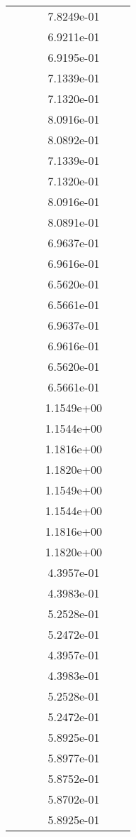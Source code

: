 \begin{xltabular}{\textwidth}{r|rS[table-format=1.3e+2]S[table-format=1.4e+2]S[table-format=1.4e+2]S[table-format=-1.5]}
&  &  & 7.8249e-01 & & \\
&  &  & 6.9211e-01 & & \\
&  &  & 6.9195e-01 & & \\
&  &  & 7.1339e-01 & & \\
&  &  & 7.1320e-01 & & \\
&  &  & 8.0916e-01 & & \\
&  &  & 8.0892e-01 & & \\
&  &  & 7.1339e-01 & & \\
&  &  & 7.1320e-01 & & \\
&  &  & 8.0916e-01 & & \\
&  &  & 8.0891e-01 & & \\
&  &  & 6.9637e-01 & & \\
&  &  & 6.9616e-01 & & \\
&  &  & 6.5620e-01 & & \\
&  &  & 6.5661e-01 & & \\
&  &  & 6.9637e-01 & & \\
&  &  & 6.9616e-01 & & \\
&  &  & 6.5620e-01 & & \\
&  &  & 6.5661e-01 & & \\
&  &  & 1.1549e+00 & & \\
&  &  & 1.1544e+00 & & \\
&  &  & 1.1816e+00 & & \\
&  &  & 1.1820e+00 & & \\
&  &  & 1.1549e+00 & & \\
&  &  & 1.1544e+00 & & \\
&  &  & 1.1816e+00 & & \\
&  &  & 1.1820e+00 & & \\
&  &  & 4.3957e-01 & & \\
&  &  & 4.3983e-01 & & \\
&  &  & 5.2528e-01 & & \\
&  &  & 5.2472e-01 & & \\
&  &  & 4.3957e-01 & & \\
&  &  & 4.3983e-01 & & \\
&  &  & 5.2528e-01 & & \\
&  &  & 5.2472e-01 & & \\
&  &  & 5.8925e-01 & & \\
&  &  & 5.8977e-01 & & \\
&  &  & 5.8752e-01 & & \\
&  &  & 5.8702e-01 & & \\
&  &  & 5.8925e-01 & & \\

\end{xltabular}
